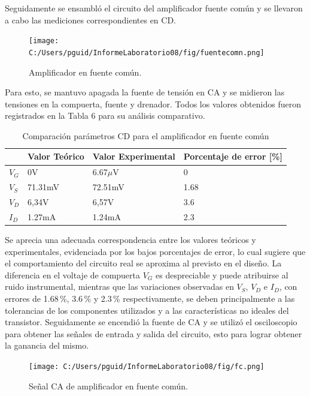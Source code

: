 \documentclass[journal]{IEEEtran}
\begin{document}
	\par Seguidamente se ensambló el circuito del amplificador fuente común y se llevaron a cabo las mediciones correspondientes en CD.
	\begin{figure}[H]
		\centering
		\texttt{[image: C:/Users/pguid/InformeLaboratorio08/fig/fuentecomn.png]}
		\caption{Amplificador en fuente común.}
		\label{fig:amplificador_fuente_común}
	\end{figure}
	\par Para esto, se mantuvo apagada la fuente de tensión en CA y se midieron las tensiones en la compuerta, fuente y drenador. Todos los valores obtenidos fueron registrados en la Tabla 6 para su análisis comparativo.
	\begin{table}[h]
		\caption{Comparación parámetros CD para el amplificador en fuente común}
		\centering
		\renewcommand{\arraystretch}{1.2} %
		\begin{tabular}{|l|p{2cm}|p{2cm}|p{2cm}|}
			\hline
			& \textbf{Valor Teórico} & \textbf{Valor Experimental} & \textbf{Porcentaje de error [\%]} \\
			\hline
			\( V_G \) & 0V  & 6.67$\mu$V  & 0 \\
			\hline
			\( V_S \) & 71.31mV   & 72.51mV  & 1.68 \\
			\hline
			\( V_D \) & 6,34V & 6,57V & 3.6 \\
			\hline
			\( I_D \) & 1.27mA & 1.24mA & 2.3 \\
			\hline
		\end{tabular}
		\label{tab:circuito2}
	\end{table}
	\par Se aprecia una adecuada correspondencia entre los valores teóricos y experimentales, evidenciada por los bajos porcentajes de error, lo cual sugiere que el comportamiento del circuito real se aproxima al previsto en el diseño. La diferencia en el voltaje de compuerta \( V_G \) es despreciable y puede atribuirse al ruido instrumental, mientras que las variaciones observadas en \( V_S \), \( V_D \) e \( I_D \), con errores de 1.68\,\%, 3.6\,\% y 2.3\,\% respectivamente, se deben principalmente a las tolerancias de los componentes utilizados y a las características no ideales del transistor.
	Seguidamente se encendió la fuente de CA y se utilizó el osciloscopio para obtener las señales de entrada y salida del circuito, esto para lograr obtener la ganancia del mismo.
	\begin{figure}[H]
		\centering
		\texttt{[image: C:/Users/pguid/InformeLaboratorio08/fig/fc.png]}
		\caption{Señal CA de amplificador en fuente común.}
		\label{fig:amplificador_fuente_común}
	\end{figure}
\end{document}
